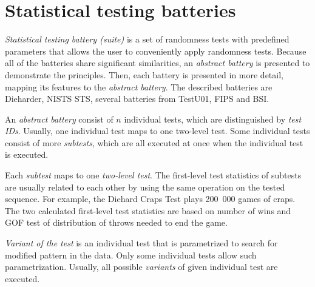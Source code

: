 \documentclass[
  digital,     %
  oneside,     %
  nosansbold,  %
  nocolorbold, %
  nolof,         %
  nolot,         %
]{fithesis4}
\begin{document}
\section{Statistical testing batteries} \label{chap:sols-batteries}



\emph{Statistical testing battery (suite)} is a set of randomness tests with predefined parameters that allows the user to conveniently apply randomness tests. \cite[p. 5]{tu01_guide} Because all of the batteries share significant similarities, an \emph{abstract battery} is presented to demonstrate the principles. Then, each battery is presented in more detail, mapping its features to the \emph{abstract battery}. The described batteries are Dieharder, NISTS STS, several batteries from TestU01, FIPS and BSI.


An \emph{abstract battery} consist of $n$ individual tests, which are distinguished by \emph{test IDs}. Usually, one individual test maps to one two-level test. Some individual tests consist of more \emph{subtests}, which are all executed at once when the individual test is executed.

Each \emph{subtest} maps to one \emph{two-level test}. The first-level test statistics of subtests are usually related to each other by using the same operation on the tested sequence. For example, the Diehard Craps Test plays 200~000 games of craps. The two calculated first-level test statistics are based on number of wins and GOF test of distribution of throws needed to end the game. \cite{dieharder_orig}

\emph{Variant of the test} is an individual test that is parametrized to search for modified pattern in the data. Only some individual tests allow such parametrization. Usually, all possible \emph{variants} of given individual test are executed.  \cite[p. 2]{vavercak}
\end{document}
